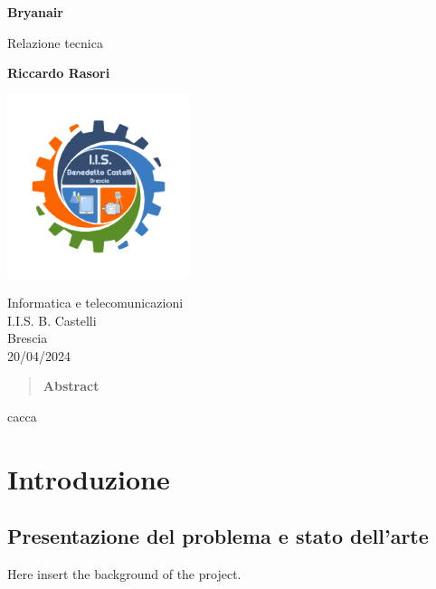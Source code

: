 \documentclass{article}
\begin{document}
\begin{titlepage}

    \begin{center}
        \vspace*{1cm}

        \Huge
        \textbf{Bryanair}

        \vspace{0.5cm}
        \LARGE
        Relazione tecnica

        \vspace{1.5cm}

        \textbf{Riccardo Rasori}

        \vfill



        \vspace{0.8cm}

        \includegraphics[width=0.4\textwidth]{iislogo.png}

        \Large
        Informatica e telecomunicazioni\\
        I.I.S. B. Castelli\\
        Brescia\\
        20/04/2024

    \end{center}

\end{titlepage}


\begin{abstract}
    \textbf{Abstract}
\end{abstract}
cacca
\tableofcontents
\section{Introduzione}
\subsection{Presentazione del problema e stato dell'arte}
Here insert the background of the project.
\end{document}
